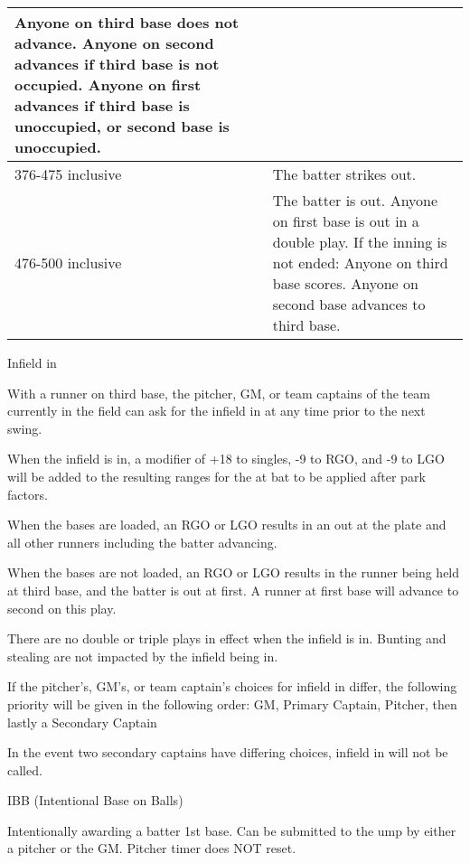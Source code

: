 \begin{deepEnumerate}
\begin{deepEnumerate}
\begin{center}
\begin{tabular}{|p{3cm}|p{8cm}|}
				Anyone on third base does not advance.
				Anyone on second advances if third base is not occupied.
				Anyone on first advances if third base is unoccupied, or second base is unoccupied. \\
				\hline 
				376-475 inclusive              & The batter strikes out.                          \\
				\hline
				476-500 inclusive              & The batter is out.                               
				Anyone on first base is out in a double play.
				If the inning is not ended:
				Anyone on third base scores.
				Anyone on second base advances to third base. \\
				\hline
			\end{tabular}
		\end{center}
    \end{deepEnumerate}
    \item Infield in
    \begin{deepEnumerate}
        \item With a runner on third base, the pitcher, GM, or team captains of the team currently in the field 
        can ask for the infield in at any time prior to the next swing.
        \item When the infield is in, a modifier of +18 to singles, -9 to RGO, and -9 to LGO 
        will be added to the resulting ranges for the at bat to be applied after park factors.
        \item When the bases are loaded, an RGO or LGO results in an out at the plate and all other runners including the batter advancing.
        \item When the bases are not loaded, an RGO or LGO results in the runner being held at third base, and the batter is out at first. 
        A runner at first base will advance to second on this play.
        \item There are no double or triple plays in effect when the infield is in. 
        Bunting and stealing are not impacted by the infield being in.
        \item If the pitcher’s, GM’s, or team captain’s choices for infield in differ, 
        the following priority will be given in the following order: 
        GM, Primary Captain, Pitcher, then lastly a Secondary Captain
        \begin{deepEnumerate}
            \item In the event two secondary captains have differing choices, infield in will not be called.
        \end{deepEnumerate}
    \end{deepEnumerate}
    \item IBB (Intentional Base on Balls)
    \begin{deepEnumerate}
        \item Intentionally awarding a batter 1st base. 
        Can be submitted to the ump by either a pitcher or the GM. 
        Pitcher timer does NOT reset.
    \end{deepEnumerate}
\end{deepEnumerate}
